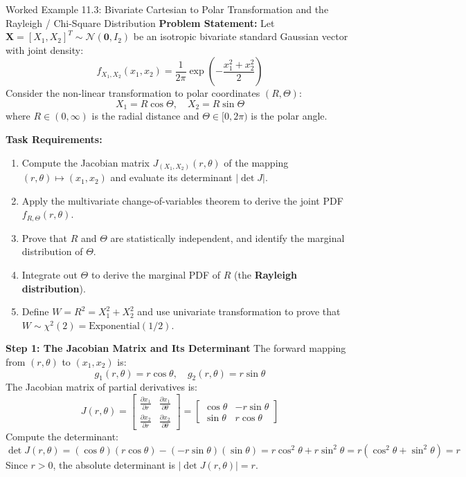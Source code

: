 \begin{examplebox}[breakable]{Worked Example 11.3: Bivariate Cartesian to Polar Transformation and the Rayleigh / Chi-Square Distribution}
\textbf{Problem Statement:}
Let $\mathbf{X} = [X_1, X_2]^T \sim \mathcal{N}(\mathbf{0}, I_2)$ be an isotropic bivariate standard Gaussian vector with joint density:
\begin{equation}
f_{X_1, X_2}(x_1, x_2) = \frac{1}{2\pi} \exp\left( -\frac{x_1^2 + x_2^2}{2} \right)
\end{equation}
Consider the non-linear transformation to polar coordinates $(R, \Theta)$:
\begin{equation}
X_1 = R \cos\Theta, \quad X_2 = R \sin\Theta
\end{equation}
where $R \in (0, \infty)$ is the radial distance and $\Theta \in [0, 2\pi)$ is the polar angle.

\textbf{Task Requirements:}
\begin{enumerate}
    \item Compute the Jacobian matrix $J_{(X_1, X_2)}(r, \theta)$ of the mapping $(r, \theta) \mapsto (x_1, x_2)$ and evaluate its determinant $|\det J|$.
    \item Apply the multivariate change-of-variables theorem to derive the joint PDF $f_{R, \Theta}(r, \theta)$.
    \item Prove that $R$ and $\Theta$ are statistically independent, and identify the marginal distribution of $\Theta$.
    \item Integrate out $\Theta$ to derive the marginal PDF of $R$ (the \textbf{Rayleigh distribution}).
    \item Define $W = R^2 = X_1^2 + X_2^2$ and use univariate transformation to prove that $W \sim \chi^2(2) = \text{Exponential}(1/2)$.
\end{enumerate}

\tcblower

\textbf{Step 1: The Jacobian Matrix and Its Determinant}
The forward mapping from $(r, \theta)$ to $(x_1, x_2)$ is:
\begin{equation}
g_1(r, \theta) = r \cos\theta, \quad g_2(r, \theta) = r \sin\theta
\end{equation}
The Jacobian matrix of partial derivatives is:
\begin{equation}
J(r, \theta) = \begin{bmatrix} \frac{\partial x_1}{\partial r} & \frac{\partial x_1}{\partial \theta} \\ \frac{\partial x_2}{\partial r} & \frac{\partial x_2}{\partial \theta} \end{bmatrix} = \begin{bmatrix} \cos\theta & -r\sin\theta \\ \sin\theta & r\cos\theta \end{bmatrix}
\end{equation}
Compute the determinant:
\begin{equation}
\det J(r, \theta) = (\cos\theta)(r\cos\theta) - (-r\sin\theta)(\sin\theta) = r\cos^2\theta + r\sin^2\theta = r(\cos^2\theta + \sin^2\theta) = r
\end{equation}
Since $r > 0$, the absolute determinant is $|\det J(r, \theta)| = r$.


\end{examplebox}
